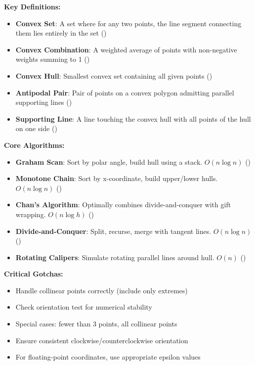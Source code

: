 \begin{summarycard}
\label{summary:D}
\textbf{Key Definitions:}
\begin{itemize}
    \item \textbf{Convex Set}: A set where for any two points, the line segment connecting them lies entirely in the set ()
    \item \textbf{Convex Combination}: A weighted average of points with non-negative weights summing to 1 ()
    \item \textbf{Convex Hull}: Smallest convex set containing all given points ()
    \item \textbf{Antipodal Pair}: Pair of points on a convex polygon admitting parallel supporting lines ()
    \item \textbf{Supporting Line}: A line touching the convex hull with all points of the hull on one side ()
\end{itemize}

\textbf{Core Algorithms:}
\begin{itemize}
    \item \textbf{Graham Scan}: Sort by polar angle, build hull using a stack. $O(n \log n)$ ()
    \item \textbf{Monotone Chain}: Sort by x-coordinate, build upper/lower hulls. $O(n \log n)$ ()
    \item \textbf{Chan's Algorithm}: Optimally combines divide-and-conquer with gift wrapping. $O(n \log h)$ ()
    \item \textbf{Divide-and-Conquer}: Split, recurse, merge with tangent lines. $O(n \log n)$ ()
    \item \textbf{Rotating Calipers}: Simulate rotating parallel lines around hull. $O(n)$ ()
\end{itemize}

\textbf{Critical Gotchas:}
\begin{itemize}
    \item Handle collinear points correctly (include only extremes)
    \item Check orientation test for numerical stability
    \item Special cases: fewer than 3 points, all collinear points
    \item Ensure consistent clockwise/counterclockwise orientation
    \item For floating-point coordinates, use appropriate epsilon values
\end{itemize}


\end{summarycard}
